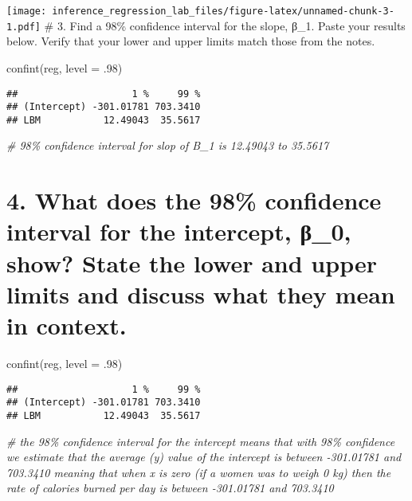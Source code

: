 \documentclass[
]{article}
\newenvironment{Shaded}{\begin{snugshade}}{\end{snugshade}}
\newcommand{\AttributeTok}[1]{\textcolor[rgb]{0.77,0.63,0.00}{#1}}
\newcommand{\CommentTok}[1]{\textcolor[rgb]{0.56,0.35,0.01}{\textit{#1}}}
\newcommand{\DecValTok}[1]{\textcolor[rgb]{0.00,0.00,0.81}{#1}}
\newcommand{\FunctionTok}[1]{\textcolor[rgb]{0.00,0.00,0.00}{#1}}
\newcommand{\NormalTok}[1]{#1}
\begin{document}
\texttt{[image: inference\_regression\_lab\_files/figure-latex/unnamed-chunk-3-1.pdf]}
\# 3. Find a 98\% confidence interval for the slope, β\_1. Paste your
results below. Verify that your lower and upper limits match those from
the notes.

\begin{Shaded}
\begin{Highlighting}[]
\FunctionTok{confint}\NormalTok{(reg, }\AttributeTok{level =}\NormalTok{ .}\DecValTok{98}\NormalTok{)}
\end{Highlighting}
\end{Shaded}

\begin{verbatim}
##                    1 %     99 %
## (Intercept) -301.01781 703.3410
## LBM           12.49043  35.5617
\end{verbatim}

\begin{Shaded}
\begin{Highlighting}[]
\CommentTok{\# 98\% confidence interval for slop of B\_1 is 12.49043 to 35.5617}
\end{Highlighting}
\end{Shaded}

\hypertarget{what-does-the-98-confidence-interval-for-the-intercept-ux3b2_0-show-state-the-lower-and-upper-limits-and-discuss-what-they-mean-in-context.}{%
\section{4. What does the 98\% confidence interval for the intercept,
β\_0, show? State the lower and upper limits and discuss what they mean
in
context.}\label{what-does-the-98-confidence-interval-for-the-intercept-ux3b2_0-show-state-the-lower-and-upper-limits-and-discuss-what-they-mean-in-context.}}

\begin{Shaded}
\begin{Highlighting}[]
\FunctionTok{confint}\NormalTok{(reg, }\AttributeTok{level =}\NormalTok{ .}\DecValTok{98}\NormalTok{)}
\end{Highlighting}
\end{Shaded}

\begin{verbatim}
##                    1 %     99 %
## (Intercept) -301.01781 703.3410
## LBM           12.49043  35.5617
\end{verbatim}

\begin{Shaded}
\begin{Highlighting}[]
\CommentTok{\# the 98\% confidence interval for the intercept means that with 98\% confidence we estimate that the average (y) value of the intercept is between {-}301.01781 and 703.3410 meaning that when x is zero (if a women was to weigh 0 kg) then the rate of calories burned per day is between {-}301.01781 and 703.3410}
\end{Highlighting}
\end{Shaded}
\end{document}
